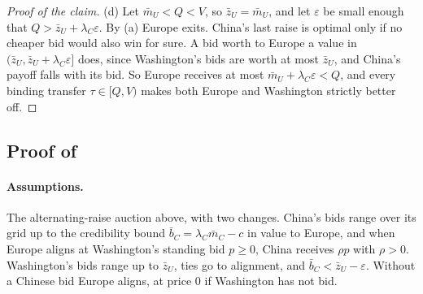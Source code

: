 \begin{proof}[Proof of the claim]
(d) Let $\bar m_U<Q<V$, so $\bar z_U=\bar m_U$, and let $\varepsilon$ be small enough that $Q>\bar z_U+\lambda_C\varepsilon$. By (a) Europe exits. China's last raise is optimal only if no cheaper bid would also win for sure. A bid worth to Europe a value in $(\bar z_U,\bar z_U+\lambda_C\varepsilon]$ does, since Washington's bids are worth at most $\bar z_U$, and China's payoff falls with its bid. So Europe receives at most $\bar m_U+\lambda_C\varepsilon<Q$, and every binding transfer $\tau\in[Q,V)$ makes both Europe and Washington strictly better off.
\end{proof}

\subsection{Proof of \texorpdfstring{}{price driving}}

\paragraph{Assumptions.} The alternating-raise auction above, with two changes. China's bids range over its grid up to the credibility bound $\bar b_C=\lambda_C\bar m_C-c$ in value to Europe, and when Europe aligns at Washington's standing bid $p\ge 0$, China receives $\rho p$ with $\rho>0$. Washington's bids range up to $\bar z_U$, ties go to alignment, and $\bar b_C<\bar z_U-\varepsilon$. Without a Chinese bid Europe aligns, at price $0$ if Washington has not bid.

